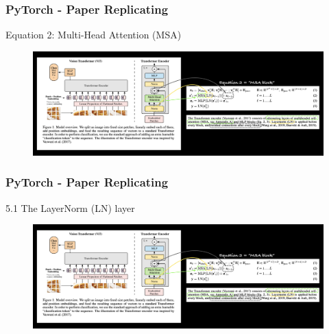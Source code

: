 \documentclass{beamer}
\begin{document}
\begin{frame}
	\frametitle{PyTorch - Paper Replicating}
	\begin{block}{Equation 2: Multi-Head Attention (MSA)}
		
		\begin{figure}
			\centering
			\includegraphics[width=1\linewidth]{figures/msa}
		\end{figure}
		
	\end{block}
\end{frame}
\begin{frame}
	\frametitle{PyTorch - Paper Replicating}
	\begin{block}{5.1 The LayerNorm (LN) layer}
		
		\begin{figure}
			\centering
			\includegraphics[width=1\linewidth]{figures/msa}
		\end{figure}
		
	\end{block}
\end{frame}
\end{document}
